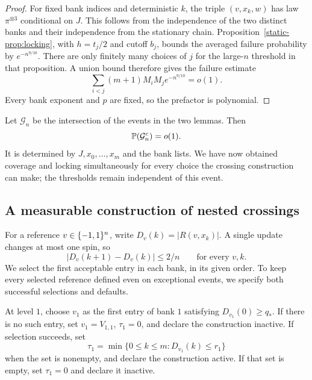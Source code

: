 \begin{proof}
For fixed bank indices and deterministic $k$, the triple $(v,x_k,w)$
has law $\pi^{\otimes3}$ conditional on $J$. This follows from the
independence of the two distinct banks and their independence from the
stationary chain. Proposition~\ref{static-prop:locking}, with
$h=t_j/2$ and cutoff $b_j$, bounds the averaged failure probability by
$e^{-n^{9/10}}$. There are only finitely many choices of $j$ for the
large-$n$ threshold in that proposition. A union bound therefore gives
the failure estimate
\begin{equation}\label{fixed-eq:locking-failure}
 \sum_{i<j}(m+1)M_iM_j e^{-n^{9/10}}=o(1).
\end{equation}
Every bank exponent and $p$ are fixed, so the prefactor is polynomial.
\end{proof}

Let $\mathcal G_n$ be the intersection of the events in the two lemmas.
Then
\begin{equation}\label{fixed-eq:good-event}
 \mathbb P(\mathcal G_n^c)=o(1).
\end{equation}
It is determined by $J,x_0,\ldots,x_m$ and the bank lists. We have now
obtained coverage and locking simultaneously for every choice the
crossing construction can make; the thresholds remain independent of
this event.

\subsection{A measurable construction of nested crossings}
\label{fixed-subsec:construction}

For a reference $v\in\{-1,1\}^n$, write $D_v(k)=|R(v,x_k)|$. A single
update changes at most one spin, so
\begin{equation}\label{fixed-eq:one-step}
 |D_v(k+1)-D_v(k)|\le2/n
 \qquad\text{for every }v,k.
\end{equation}
We select the first acceptable entry in each bank, in its given order.
To keep every selected reference defined even on exceptional events,
we specify both successful selections and defaults.

At level $1$, choose $v_1$ as the first entry of bank $1$ satisfying
$D_{v_1}(0)\ge q_*$. If there is no such entry, set $v_1=V_{1,1}$,
$\tau_1=0$, and declare the construction inactive. If selection
succeeds, set
\begin{equation}\label{fixed-eq:first-crossing}
 \tau_1=\min\{0\le k\le m:D_{v_1}(k)\le r_1\}
\end{equation}
when the set is nonempty, and declare the construction active. If that
set is empty, set $\tau_1=0$ and declare it inactive.

